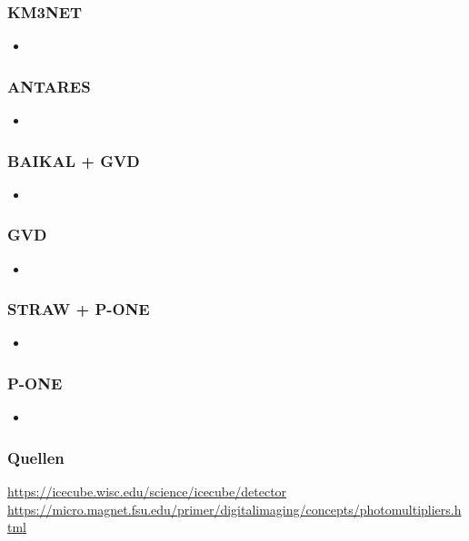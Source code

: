 \documentclass[aspectratio=1610, 9pt]{beamer}
\begin{document}
\begin{frame}\frametitle{KM3NET}
  \begin{itemize}
    \item 
  \end{itemize}
\end{frame}

\begin{frame}\frametitle{ANTARES}
  \begin{itemize}
    \item 
  \end{itemize}
\end{frame}

\begin{frame}\frametitle{BAIKAL + GVD}
  \begin{itemize}
    \item 
  \end{itemize}
\end{frame}

\begin{frame}\frametitle{GVD}
  \begin{itemize}
    \item 
  \end{itemize}
\end{frame}

\begin{frame}\frametitle{STRAW + P-ONE}
  \begin{itemize}
    \item 
  \end{itemize}
\end{frame}

\begin{frame}\frametitle{P-ONE}
  \begin{itemize}
    \item 
  \end{itemize}
\end{frame}

\begin{frame}\frametitle{Quellen}
\url{https://icecube.wisc.edu/science/icecube/detector} \\
\url{https://micro.magnet.fsu.edu/primer/digitalimaging/concepts/photomultipliers.html} \\

\end{frame}
\end{document}

